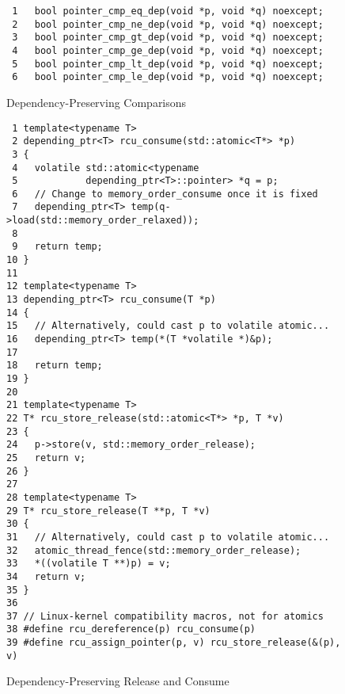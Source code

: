 \begin{figure}[tbp]
{ \scriptsize
\begin{verbatim}
 1   bool pointer_cmp_eq_dep(void *p, void *q) noexcept;
 2   bool pointer_cmp_ne_dep(void *p, void *q) noexcept;
 3   bool pointer_cmp_gt_dep(void *p, void *q) noexcept;
 4   bool pointer_cmp_ge_dep(void *p, void *q) noexcept;
 5   bool pointer_cmp_lt_dep(void *p, void *q) noexcept;
 6   bool pointer_cmp_le_dep(void *p, void *q) noexcept;
\end{verbatim}
}
\caption{Dependency-Preserving Comparisons}
\label{fig:Dependency-Preserving Comparisons}
\end{figure}

\begin{figure}[tbp]
{ \scriptsize
\begin{verbatim}
 1 template<typename T>
 2 depending_ptr<T> rcu_consume(std::atomic<T*> *p)
 3 {
 4   volatile std::atomic<typename
 5            depending_ptr<T>::pointer> *q = p;
 6   // Change to memory_order_consume once it is fixed
 7   depending_ptr<T> temp(q->load(std::memory_order_relaxed));
 8
 9   return temp;
10 }
11
12 template<typename T>
13 depending_ptr<T> rcu_consume(T *p)
14 {
15   // Alternatively, could cast p to volatile atomic...
16   depending_ptr<T> temp(*(T *volatile *)&p);
17
18   return temp;
19 }
20
21 template<typename T>
22 T* rcu_store_release(std::atomic<T*> *p, T *v)
23 {
24   p->store(v, std::memory_order_release);
25   return v;
26 }
27
28 template<typename T>
29 T* rcu_store_release(T **p, T *v)
30 {
31   // Alternatively, could cast p to volatile atomic...
32   atomic_thread_fence(std::memory_order_release);
33   *((volatile T **)p) = v;
34   return v;
35 }
36
37 // Linux-kernel compatibility macros, not for atomics
38 #define rcu_dereference(p) rcu_consume(p)
39 #define rcu_assign_pointer(p, v) rcu_store_release(&(p), v)
\end{verbatim}
}
\caption{Dependency-Preserving Release and Consume}
\label{fig:Dependency-Preserving Release and Consume}
\end{figure}


